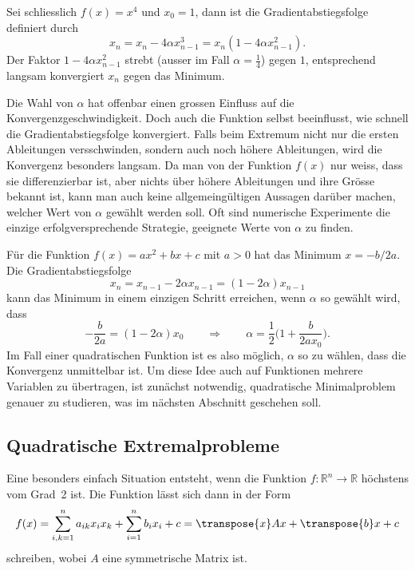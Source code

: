 \begin{beispiel}
Sei schliesslich $f(x)=x^4$ und $x_0=1$, dann  ist die Gradientabstiegsfolge
definiert durch
\[
x_n
=
x_n - 4\alpha x_{n-1}^3
=
x_n(1-4\alpha x_{n-1}^2).
\]
Der Faktor $1-4\alpha x_{n-1}^2$ strebt (ausser im Fall $\alpha=\frac14$) 
gegen $1$, entsprechend langsam konvergiert $x_n$ gegen das Minimum.
\end{beispiel}

Die Wahl von $\alpha$ hat offenbar einen grossen Einfluss auf die
Konvergenzgeschwindigkeit.
Doch auch die Funktion selbst beeinflusst,
wie schnell die Gradientabstiegsfolge konvergiert.
Falls beim Extremum nicht nur die ersten Ableitungen versschwinden,
sondern auch noch höhere Ableitungen, wird die Konvergenz besonders
langsam.
Da man von der Funktion $f(x)$ nur weiss, dass sie differenzierbar ist,
aber nichts über höhere Ableitungen und ihre Grösse bekannt ist, kann
man auch keine allgemeingültigen Aussagen darüber machen, welcher Wert
von $\alpha$ gewählt werden soll.
Oft sind numerische Experimente die einzige erfolgversprechende
Strategie, geeignete Werte von $\alpha$ zu finden.

Für die Funktion $f(x)=ax^2+bx+c$ mit $a>0$ hat das Minimum $x=-b/2a$.
Die Gradientabstiegsfolge
\[
x_n 
=
x_{n-1} - 2\alpha x_{n-1}
=
(1-2\alpha)x_{n-1}
\]
kann das Minimum in einem einzigen Schritt erreichen, wenn $\alpha$
so gewählt wird, dass
\[
-\frac{b}{2a}
=
(1-2\alpha)x_0
\qquad
\Rightarrow
\qquad
\alpha
=
\frac12\biggl(
1+\frac{b}{2ax_0}
\biggr).
\]
Im Fall einer quadratischen Funktion ist es also möglich, $\alpha$ so
zu wählen, dass die Konvergenz unmittelbar ist.
Um diese Idee auch auf Funktionen mehrere Variablen zu übertragen,
ist zunächst notwendig, quadratische Minimalproblem genauer zu
studieren, was im nächsten Abschnitt geschehen soll.

%
%
\subsection{Quadratische Extremalprobleme
\label{buch:direkt:gradient:subdsection:quadratisch}}
Eine besonders einfach Situation entsteht, wenn die Funktion
$f\colon\mathbb{R}^n\to\mathbb{R}$ höchstens vom Grad~2 ist.
Die Funktion lässt sich dann in der Form
\[
f(x)
=
\sum_{i,k=1}^n a_{ik}x_ix_k
+
\sum_{i=1}^n b_ix_i
+ c
=
\transpose{x}Ax + \transpose{b}x + c
\]
schreiben, wobei $A$ eine symmetrische Matrix ist.

%
%
